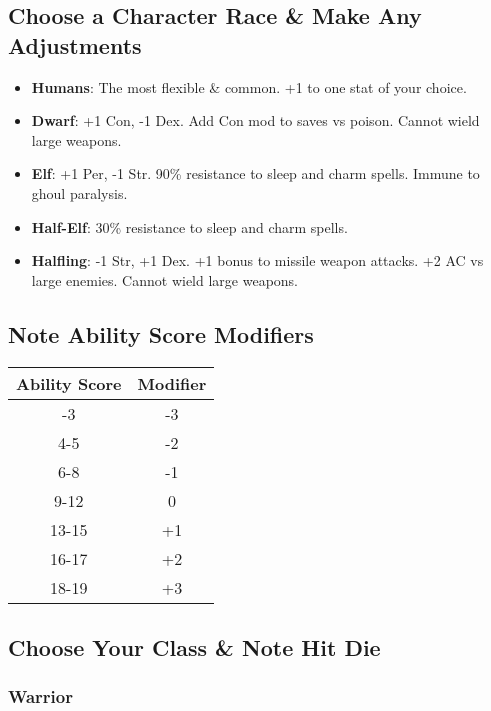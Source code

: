 \documentclass{article}
\begin{document}
\begin{multicols}{2}
\subsection{Choose a Character Race \& Make Any
Adjustments}\label{choose-a-character-race-make-any-adjustments}

\begin{itemize}
\tightlist
\item
  \textbf{Humans}: The most flexible \& common. +1 to one stat of your
  choice.
\item
  \textbf{Dwarf}: +1 Con, -1 Dex. Add Con mod to saves vs poison. Cannot
  wield large weapons.
\item
  \textbf{Elf}: +1 Per, -1 Str. 90\% resistance to sleep and charm
  spells. Immune to ghoul paralysis.
\item
  \textbf{Half-Elf}: 30\% resistance to sleep and charm spells.
\item
  \textbf{Halfling}: -1 Str, +1 Dex. +1 bonus to missile weapon attacks.
  +2 AC vs large enemies. Cannot wield large weapons.
\end{itemize}

\subsection{Note Ability Score
Modifiers}\label{note-ability-score-modifiers}

\begin{longtable}[]{@{}cc@{}}
\toprule\noalign{}
Ability Score & Modifier \\
\midrule\noalign{}
\endhead
\bottomrule\noalign{}
\endlastfoot
2-3 & -3 \\
4-5 & -2 \\
6-8 & -1 \\
9-12 & 0 \\
13-15 & +1 \\
16-17 & +2 \\
18-19 & +3 \\
\end{longtable}

\subsection{Choose Your Class \& Note Hit
Die}\label{choose-your-class-note-hit-die}

\subsubsection{Warrior}\label{warrior}


\end{multicols}
\end{document}
